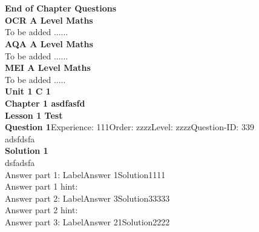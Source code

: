 \documentclass{article}
\begin{document}
\\[4pt]
\\[2pt]
\noindent\large{\textbf{End of Chapter Questions}}\\[15pt]
\noindent\Huge{\textbf{OCR A Level Maths}}\\[5pt]
\noindent\large{To be added ......}\\[20pt]
\noindent\Huge{\textbf{AQA A Level Maths}}\\[5pt]
\noindent\large{To be added ......}\\[20pt]
\noindent\Huge{\textbf{MEI A Level Maths}}\\[5pt]
\noindent\large{To be added .....}\\[20pt]
\noindent\huge{\textbf{Unit 1 C 1}}\\[18pt]
\noindent\huge{\textbf{Chapter 1 asdfasfd}}\\[15pt]
\noindent\huge{\textbf{Lesson 1 Test }}\\[12pt]
\noindent\textbf{Question 1}\hspace{20pt}Experience: 111\hspace{20pt}Order: zzzz\hspace{20pt}Level: zzzz\hspace{20pt}Question-ID: 339\\[2pt]
adsfdsfa\\[4pt]
\noindent\textbf{Solution 1}\\[2pt]
dsfadsfa\\[4pt]
Answer part 1: \hspace{10pt}Label\hspace{10pt}Answer 1\hspace{10pt}Solution\hspace{10pt}1111\\
Answer part 1 hint: \hspace{15pt}\\
Answer part 2: \hspace{10pt}Label\hspace{10pt}Answer 3\hspace{10pt}Solution\hspace{10pt}33333\\
Answer part 2 hint: \hspace{15pt}\\
Answer part 3: \hspace{10pt}Label\hspace{10pt}Answer 21\hspace{10pt}Solution\hspace{10pt}2222\\
\end{document}
